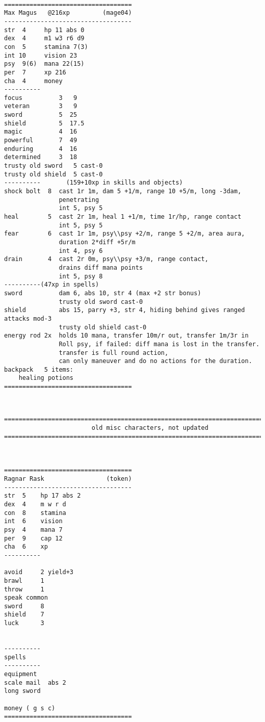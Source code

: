 \

\pagebreak[1]
\tiny \begin{samepage} \begin{verbatim}
===================================
Max Magus   @216xp         (mage04)
-----------------------------------
str  4     hp 11 abs 0
dex  4     m1 w3 r6 d9
con  5     stamina 7(3)
int 10     vision 23
psy  9(6)  mana 22(15)
per  7     xp 216
cha  4     money
----------
focus          3   9
veteran        3   9
sword          5  25
shield         5  17.5
magic          4  16
powerful       7  49
enduring       4  16
determined     3  18
trusty old sword   5 cast-0
trusty old shield  5 cast-0
----------       (159+10xp in skills and objects)
shock bolt  8  cast 1r 1m, dam 5 +1/m, range 10 +5/m, long -3dam,
               penetrating
               int 5, psy 5
heal        5  cast 2r 1m, heal 1 +1/m, time 1r/hp, range contact
               int 5, psy 5
fear        6  cast 1r 1m, psy\\psy +2/m, range 5 +2/m, area aura,
               duration 2*diff +5r/m
               int 4, psy 6
drain       4  cast 2r 0m, psy\\psy +3/m, range contact,
               drains diff mana points
               int 5, psy 8
----------(47xp in spells)
sword          dam 6, abs 10, str 4 (max +2 str bonus)
               trusty old sword cast-0
shield         abs 15, parry +3, str 4, hiding behind gives ranged attacks mod-3
               trusty old shield cast-0
energy rod 2x  holds 10 mana, transfer 10m/r out, transfer 1m/3r in
               Roll psy, if failed: diff mana is lost in the transfer.
               transfer is full round action,
               can only maneuver and do no actions for the duration.
backpack   5 items:
    healing potions
===================================
\end{verbatim} \end{samepage} \normalsize


\

\pagebreak[1]
\tiny \begin{samepage} \begin{verbatim}
================================================================================
                        old misc characters, not updated
================================================================================



===================================
Ragnar Rask                 (token)
-----------------------------------
str  5    hp 17 abs 2
dex  4    m w r d
con  8    stamina
int  6    vision
psy  4    mana 7
per  9    cap 12
cha  6    xp
----------

avoid     2 yield+3
brawl     1
throw     1
speak common
sword     8
shield    7
luck      3


----------
spells
----------
equipment
scale mail  abs 2
long sword

money ( g s c)
===================================
\end{verbatim} \end{samepage} \normalsize


